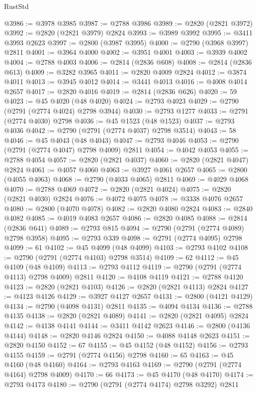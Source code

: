 \begin{lexlean}{RustStd}
\begin{coremodule}
@3986 := @3978 @3985
@3987 := @2788 @3986
@3989 := @2820 (@2821 @3972)
@3992 := @2820 (@2821 @3979) @2824
@3993 := @3989 @3992
@3995 := @3411 @3993 @2623
@3997 := @2800 (@3987 @3995)
@4000 := @2790 (@3968 @3997) @2811
@4001 := @3964 @4000
@4002 := @3951 @4001
@4003 := @3939 @4002
@4004 := @2788 @4003
@4006 := @2814 (@2836 @608)
@4008 := @2814 (@2836 @613)
@4009 := @3282 @3965
@4011 := @2820 @4009 @2824
@4012 := @3874 @4011
@4013 := @3945 @4012
@4014 := @3441 @4013
@4016 := @4008 @4014 @2657
@4017 := @2820 @4016
@4019 := @2814 (@2836 @626)
@4020 := 59
@4023 := @45 @4020 (@48 @4020)
@4024 := @2793 @4023
@4029 := @2790 (@2791 (@2774 @4024) @2798 @3944)
@4030 := @2793 @1277
@4033 := @2791 (@2774 @4030) @2798
@4036 := @45 @1523 (@48 @1523)
@4037 := @2793 @4036
@4042 := @2790 (@2791 (@2774 @4037) @2798 @3514)
@4043 := 58
@4046 := @45 @4043 (@48 @4043)
@4047 := @2793 @4046
@4053 := @2790 (@2791 (@2774 @4047) @2798 @4009) @2811
@4054 := @4042 @4053
@4055 := @2788 @4054
@4057 := @2820 (@2821 @4037)
@4060 := @2820 (@2821 @4047) @2824
@4061 := @4057 @4060
@4063 := @3927 @4061 @2657
@4065 := @2800 (@4055 @4063)
@4068 := @2790 (@4033 @4065) @2811
@4069 := @4029 @4068
@4070 := @2788 @4069
@4072 := @2820 (@2821 @4024)
@4075 := @2820 (@2821 @4030) @2824
@4076 := @4072 @4075
@4078 := @3338 @4076 @2657
@4080 := @2800 (@4070 @4078)
@4082 := @2820 @4080 @2824
@4083 := @2840 @4082
@4085 := @4019 @4083 @2657
@4086 := @2820 @4085
@4088 := @2814 (@2836 @641)
@4089 := @2793 @815
@4094 := @2790 (@2791 (@2774 @4089) @2798 @3958)
@4095 := @2793 @339
@4098 := @2791 (@2774 @4095) @2798
@4099 := 61
@4102 := @45 @4099 (@48 @4099)
@4103 := @2793 @4102
@4108 := @2790 (@2791 (@2774 @4103) @2798 @3514)
@4109 := 62
@4112 := @45 @4109 (@48 @4109)
@4113 := @2793 @4112
@4119 := @2790 (@2791 (@2774 @4113) @2798 @4009) @2811
@4120 := @4108 @4119
@4121 := @2788 @4120
@4123 := @2820 (@2821 @4103)
@4126 := @2820 (@2821 @4113) @2824
@4127 := @4123 @4126
@4129 := @3927 @4127 @2657
@4131 := @2800 (@4121 @4129)
@4134 := @2790 (@4098 @4131) @2811
@4135 := @4094 @4134
@4136 := @2788 @4135
@4138 := @2820 (@2821 @4089)
@4141 := @2820 (@2821 @4095) @2824
@4142 := @4138 @4141
@4144 := @3411 @4142 @2623
@4146 := @2800 (@4136 @4144)
@4148 := @2820 @4146 @2824
@4150 := @4088 @4148 @2623
@4151 := @2820 @4150
@4152 := 67
@4155 := @45 @4152 (@48 @4152)
@4156 := @2793 @4155
@4159 := @2791 (@2774 @4156) @2798
@4160 := 65
@4163 := @45 @4160 (@48 @4160)
@4164 := @2793 @4163
@4169 := @2790 (@2791 (@2774 @4164) @2798 @4009)
@4170 := 66
@4173 := @45 @4170 (@48 @4170)
@4174 := @2793 @4173
@4180 := @2790 (@2791 (@2774 @4174) @2798 @3292) @2811

\end{coremodule}
\end{lexlean}
